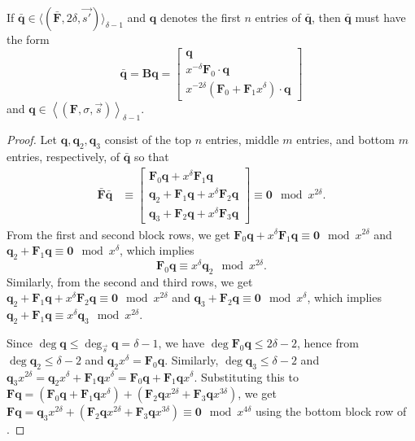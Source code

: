\begin{lem}
\label{lem:A_delta-1Form}If $\bar{\mathbf{q}}\in\langle(\bar{\mathbf{F}},2\delta,\vec{s'})\rangle_{\delta-1}$
and $\mathbf{q}$ denotes the first $n$ entries of $\bar{\mathbf{q}}$,
then $\bar{\mathbf{q}}$ must have the form 
\[
\bar{\mathbf{q}}=\mathbf{B}\mathbf{q}=\left[\begin{array}{r}
\mathbf{q}\\
x^{-\delta}\mathbf{F}_{0}\cdot\mathbf{q}\\
x^{-2\delta}\left(\mathbf{F}_{0}+\mathbf{F}_{1}x^{\delta}\right)\cdot\mathbf{q}
\end{array}\right]
\]
 and $\mathbf{q}\in\left\langle \left(\mathbf{F},\sigma,\vec{s}\right)\right\rangle _{\delta-1}$.\end{lem}
\begin{proof}
Let $\mathbf{q},\mathbf{q}_{2},\mathbf{q}_{3}$ consist of the top
$n$ entries, middle $m$ entries, and bottom $m$ entries, respectively,
of $\mathbf{\bar{\mathbf{q}}}$ so that 
\begin{align}
\bar{\mathbf{F}}\bar{\mathbf{q}} & \equiv\left[\begin{array}{r}
\mathbf{F}_{0}\mathbf{q}+x^{\delta}\mathbf{F}_{1}\mathbf{q}\\
\mathbf{q}_{2}+\mathbf{F}_{1}\mathbf{q}+x^{\delta}\mathbf{F}_{2}\mathbf{q}\\
\mathbf{q}_{3}+\mathbf{F}_{2}\mathbf{q}+x^{\delta}\mathbf{F}_{3}\mathbf{q}
\end{array}\right]\equiv\mathbf{0}\mod x^{2\delta}.\label{eq:Aq}
\end{align}
 From the first and second block rows, we get $\mathbf{F}_{0}\mathbf{q}+x^{\delta}\mathbf{F}_{1}\mathbf{q}\equiv\mathbf{0}\mod x^{2\delta}$
and $\mathbf{q}_{2}+\mathbf{F}_{1}\mathbf{q}\equiv\mathbf{0}\mod x^{\delta}$,
which implies 
\begin{equation}
\mathbf{F}_{0}\mathbf{q}\equiv x^{\delta}\mathbf{q}_{2}\mod x^{2\delta}.\label{eq:q1q2}
\end{equation}
 Similarly, from the second and third rows, we get $\mathbf{q}_{2}+\mathbf{F}_{1}\mathbf{q}+x^{\delta}\mathbf{F}_{2}\mathbf{q}\equiv\mathbf{0}\mod x^{2\delta}$
and $\mathbf{q}_{3}+\mathbf{F}_{2}\mathbf{q}\equiv\mathbf{0}\mod x^{\delta}$,
which implies $\mathbf{q}_{2}+\mathbf{F}_{1}\mathbf{q}\equiv x^{\delta}\mathbf{q}_{3}\mod x^{2\delta}$.

Since $\deg\mathbf{q}\le\deg_{\vec{s}}\mathbf{q}=\delta-1$, we have
$\deg\mathbf{F}_{0}\mathbf{q}\le2\delta-2$, hence from 
$\deg\mathbf{q}_{2}\le\delta-2$ and $\mathbf{q}_{2}x^{\delta}=\mathbf{F}_{0}\mathbf{q}$.
Similarly, $\deg\mathbf{q}_{3}\le\delta-2$ and $\mathbf{q}_{3}x^{2\delta}=\mathbf{q}_{2}x^{\delta}+\mathbf{F}_{1}\mathbf{q}x^{\delta}=\mathbf{F}_{0}\mathbf{q}+\mathbf{F}_{1}\mathbf{q}x^{\delta}$.
Substituting this to $\mathbf{F}\mathbf{q}=(\mathbf{F}_{0}\mathbf{q}+\mathbf{F}_{1}\mathbf{q}x^{\delta})+(\mathbf{F}_{2}\mathbf{q}x^{2\delta}+\mathbf{F}_{3}\mathbf{q}x^{3\delta})$,
we get $\mathbf{F}\mathbf{q}=\mathbf{q}_{3}x^{2\delta}+(\mathbf{F}_{2}\mathbf{q}x^{2\delta}+\mathbf{F}_{3}\mathbf{q}x^{3\delta})\equiv\mathbf{0}\mod x^{4\delta}$
using the bottom block row of .\end{proof}
